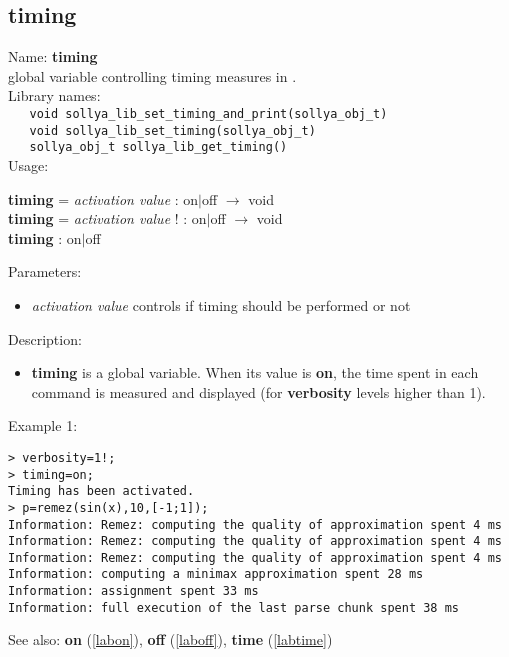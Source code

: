 \subsection{timing}
\label{labtiming}
\noindent Name: \textbf{timing}\\
\phantom{aaa}global variable controlling timing measures in \sollya.\\[0.2cm]
\noindent Library names:\\
\verb|   void sollya_lib_set_timing_and_print(sollya_obj_t)|\\
\verb|   void sollya_lib_set_timing(sollya_obj_t)|\\
\verb|   sollya_obj_t sollya_lib_get_timing()|\\[0.2cm]
\noindent Usage: 
\begin{center}
\textbf{timing} = \emph{activation value} : \textsf{on$|$off} $\rightarrow$ \textsf{void}\\
\textbf{timing} = \emph{activation value} ! : \textsf{on$|$off} $\rightarrow$ \textsf{void}\\
\textbf{timing} : \textsf{on$|$off}\\
\end{center}
Parameters: 
\begin{itemize}
\item \emph{activation value} controls if timing should be performed or not
\end{itemize}
\noindent Description: \begin{itemize}

\item \textbf{timing} is a global variable. When its value is \textbf{on}, the time spent in each 
   command is measured and displayed (for \textbf{verbosity} levels higher than 1).
\end{itemize}
\noindent Example 1: 
\begin{center}\begin{minipage}{15cm}\begin{Verbatim}[frame=single]
> verbosity=1!;
> timing=on;
Timing has been activated.
> p=remez(sin(x),10,[-1;1]);
Information: Remez: computing the quality of approximation spent 4 ms
Information: Remez: computing the quality of approximation spent 4 ms
Information: Remez: computing the quality of approximation spent 4 ms
Information: computing a minimax approximation spent 28 ms
Information: assignment spent 33 ms
Information: full execution of the last parse chunk spent 38 ms
\end{Verbatim}
\end{minipage}\end{center}
See also: \textbf{on} (\ref{labon}), \textbf{off} (\ref{laboff}), \textbf{time} (\ref{labtime})
